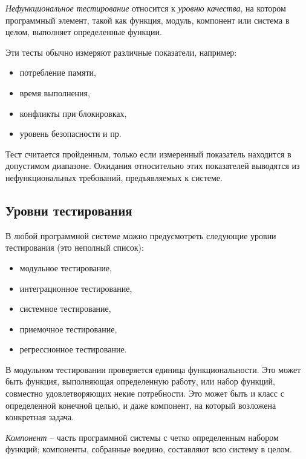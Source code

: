 \documentclass[%
	11pt,
	a4paper,
	utf8,
		]{article}
\begin{document}
\emph{Нефункциональное тестирование} относится к \emph{уровню качества}, на котором программный элемент, такой как функция, модуль, компонент или система в целом, выполняет определенные функции.

Эти тесты обычно измеряют различные показатели, например:
\begin{itemize}
	\item потребление памяти,
	
	\item время выполнения, 
	
	\item конфликты при блокировках,
	
	\item уровень безопасности и пр.
\end{itemize}

Тест считается пройденным, только если измеренный показатель находится в допустимом диапазоне. Ожидания относительно этих показателей выводятся из нефункциональных требований, предъявляемых к системе.

\subsection{Уровни тестирования}

В любой программной системе можно предусмотреть следующие уровни тестирования (это неполный список):
\begin{itemize}
	\item модульное тестирование,
	
	\item интеграционное тестирование,
	
	\item системное тестирование,
	
	\item приемочное тестирование,
	
	\item регрессионное тестирование.
\end{itemize}

В модульном тестировании проверяется единица функциональности. Это может быть функция, выполняющая определенную работу, или набор функций, совместно удовлетворяющих некие потребности. Это может быть и класс с определенной конечной целью, и даже компонент, на который возложена конкретная задача.

\emph{Компонент} -- часть программной системы с четко определенным набором функций; компоненты, собранные воедино, составляют всю систему в целом.
\end{document}
